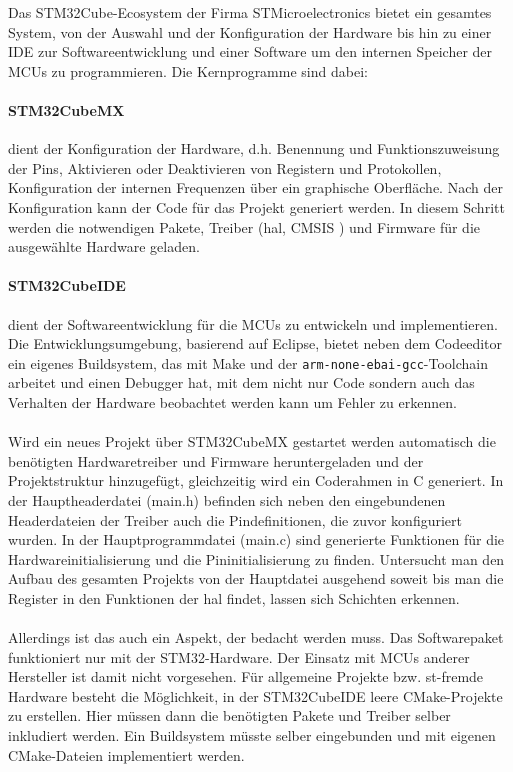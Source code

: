 Das STM32Cube-Ecosystem \cite{stm32cube_ecosystem} der Firma STMicroelectronics bietet ein gesamtes System, von der Auswahl und der Konfiguration der Hardware bis hin zu einer IDE zur Softwareentwicklung und einer Software um den internen Speicher der MCUs zu programmieren.
Die Kernprogramme sind dabei:

\paragraph{STM32CubeMX} 
	dient der Konfiguration der Hardware, d.h. Benennung und Funktionszuweisung der Pins, Aktivieren oder Deaktivieren von Registern und Protokollen, Konfiguration der internen Frequenzen über ein graphische Oberfläche.
	Nach der Konfiguration kann der Code für das Projekt generiert werden.
	In diesem Schritt werden die notwendigen Pakete, Treiber (\gls{hal}, CMSIS %
	) und Firmware für die ausgewählte Hardware geladen. \cite{stm32cubemx}

\paragraph{STM32CubeIDE}
	dient der Softwareentwicklung für die MCUs zu entwickeln und implementieren.
	Die Entwicklungsumgebung, basierend auf Eclipse, bietet neben dem Codeeditor ein eigenes Buildsystem, das mit Make und der \texttt{arm-none-ebai-gcc}-Toolchain arbeitet und einen Debugger hat, mit dem nicht nur Code sondern auch das Verhalten der Hardware beobachtet werden kann um Fehler zu erkennen. \cite{stm32cubeide}
\\
\\
Wird ein neues Projekt über STM32CubeMX gestartet werden automatisch die benötigten Hardwaretreiber und Firmware heruntergeladen und der Projektstruktur hinzugefügt, gleichzeitig wird ein Coderahmen in C generiert. 
In der Hauptheaderdatei (main.h) befinden sich neben den eingebundenen Headerdateien der Treiber auch die Pindefinitionen, die zuvor konfiguriert wurden.
In der Hauptprogrammdatei (main.c) sind generierte Funktionen für die Hardwareinitialisierung und die Pininitialisierung zu finden.
Untersucht man den Aufbau des gesamten Projekts von der Hauptdatei ausgehend soweit bis man die Register in den Funktionen der \gls{hal} findet, lassen sich Schichten erkennen.
\\
\\
Allerdings ist das auch ein Aspekt, der bedacht werden muss. 
Das Softwarepaket funktioniert nur mit der STM32-Hardware.
Der Einsatz mit MCUs anderer Hersteller ist damit nicht vorgesehen.
Für allgemeine Projekte bzw. st-fremde Hardware besteht die Möglichkeit, in der STM32CubeIDE leere CMake-Projekte zu erstellen.
Hier müssen dann die benötigten Pakete und Treiber selber inkludiert werden.
Ein Buildsystem müsste selber eingebunden und mit eigenen CMake-Dateien implementiert werden.


